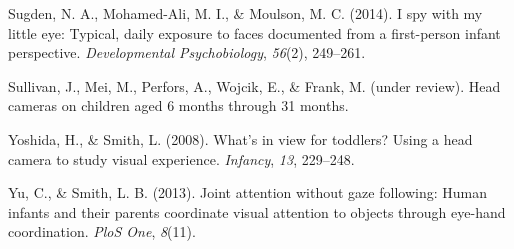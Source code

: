 \documentclass[10pt, letterpaper]{article}
\begin{document}
\hypertarget{ref-Sugden2014}{}
Sugden, N. A., Mohamed-Ali, M. I., \& Moulson, M. C. (2014). I spy with
my little eye: Typical, daily exposure to faces documented from a
first-person infant perspective. \emph{Developmental Psychobiology},
\emph{56}(2), 249--261.

\hypertarget{ref-SAYcam}{}
Sullivan, J., Mei, M., Perfors, A., Wojcik, E., \& Frank, M. (under
review). Head cameras on children aged 6 months through 31 months.

\hypertarget{ref-yoshida2008}{}
Yoshida, H., \& Smith, L. (2008). What's in view for toddlers? Using a
head camera to study visual experience. \emph{Infancy}, \emph{13},
229--248.

\hypertarget{ref-yu2013joint}{}
Yu, C., \& Smith, L. B. (2013). Joint attention without gaze following:
Human infants and their parents coordinate visual attention to objects
through eye-hand coordination. \emph{PloS One}, \emph{8}(11).


\end{document}
